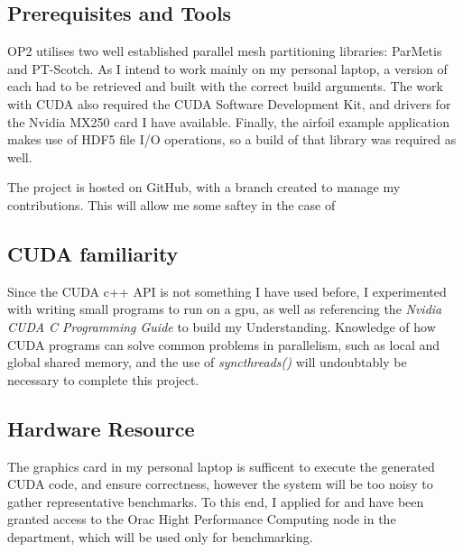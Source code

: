 \documentclass[11pt]{article}
\begin{document}
\subsection*{Prerequisites and Tools}
OP2 utilises two well established parallel mesh partitioning libraries: ParMetis\cite{metis} and PT-Scotch\cite{scotch}. As I intend to work mainly on my personal laptop, a version of each had to be retrieved and built with the correct build arguments. The work with CUDA also required the CUDA Software Development Kit\cite{cuda}, and drivers for the Nvidia MX250 card I have available. Finally, the airfoil example application makes use of HDF5 file I/O operations, so a build of that library was required as well. 
\par
The project is hosted on GitHub, with a branch created to manage my contributions. This will allow me some saftey in the case of  
\subsection*{CUDA familiarity}
Since the CUDA c++ API is not something I have used before, I experimented with writing small programs to run on a gpu, as well as referencing the \textit{Nvidia CUDA C Programming Guide} to build my Understanding. Knowledge of how CUDA programs can solve common problems in parallelism, such as local and global shared memory, and the use of \textit{syncthreads()} will undoubtably be necessary to complete this project.

\subsection*{Hardware Resource}
The graphics card in my personal laptop is sufficent to execute the generated CUDA code, and ensure correctness, however the system will be too noisy to gather representative benchmarks. To this end, I applied for and have been granted access to the Orac Hight Performance Computing node in the department, which will be used only for benchmarking.
\end{document}
